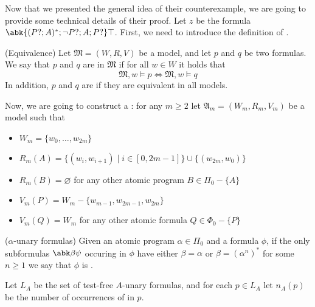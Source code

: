 \documentclass[a4paper, 12pt]{report}
\begin{document}
    Now that we presented the general idea of their counterexample, we are going to provide some technical details of their proof. Let $z$ be the formula $\abk{(P?; A)^*; \lnot P ? ; A; P ?}\top$. First, we need to introduce the definition of .

     (Equivalence) Let $\mathfrak M = (W, R, V)$ be a model, and let $p$ and $q$ be two formulas. We say that $p$ and $q$ are  in $\mathfrak M$ if for all $w \in W$ it holds that $$\mathfrak M, w \models p \iff \mathfrak M, w \models q$$ In addition, $p$ and $q$ are  if they are equivalent in all models.

    Now, we are going to construct a : for any $m \ge 2$ let $\mathfrak A_m = (W_m, R_m, V_m)$ be a model such that

    \begin{itemize}
        \item $W_m = \{w_0, \ldots, w_{2m}\}$
        \item $R_m(A) = \{(w_i, w_{i + 1}) \mid i \in [0, 2m - 1]\} \cup \{(w_{2m}, w_0)\}$
        \item $R_m(B) = \varnothing$ for any other atomic program $B \in \Pi_0 - \{A\}$
        \item $V_m(P) = W_m - \{w_{m - 1}, w_{2m - 1}, w_{2m}\}$
        \item $V_m(Q) = W_m$ for any other atomic formula $Q \in \Phi_0 - \{P\}$
    \end{itemize}



     ($\alpha$-unary formulas) Given an atomic program $\alpha \in \Pi_0$ and a formula $\phi$, if the only subformulas $\abk \beta \psi$ occuring in $\phi$ have either $\beta = \alpha$ or $\beta = (\alpha^n)^*$ for some $n \ge 1$ we say that $\phi$ is .

    Let $L_A$ be the set of test-free $A$-unary formulas, and for each $p \in L_A$ let $n_A(p)$ be the number of occurrences of  in $p$.
\end{document}
